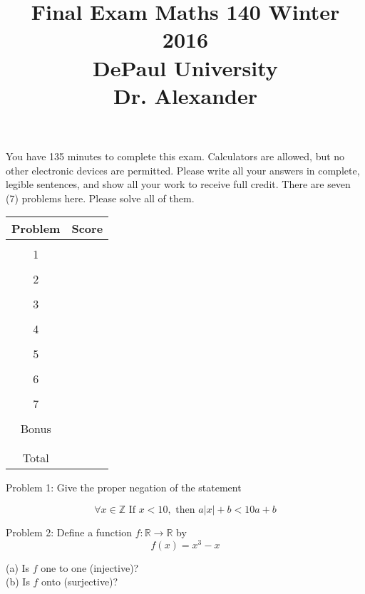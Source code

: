 \documentclass[16 pt]{amsart}
\theoremstyle{definition}
\theoremstyle{remark}
\numberwithin{equation}{subsection}
\newcommand{\R}{\mathbb{R}}
\newcommand{\Z}{\mathbb{Z}}
\begin{document}
\title{Final Exam Maths 140 Winter 2016 \\ DePaul University\\Dr. Alexander}
\maketitle
You have 135 minutes to complete this exam.  Calculators are allowed, but no other electronic devices are permitted.  Please write all your answers in complete, legible sentences, and show all your work to receive full credit.  There are seven (7) problems here.  Please solve all of them.  
\vspace{1in}


\begin{center}
  \begin{tabular}{ c | c }
    Problem & Score\\
    \hline
    &\\
    1&\\
    &\\
    2&\\
    &\\
    3&\\
    &\\
    4&\\
    &\\
    5&\\
    &\\
    6&\\
    &\\
    7&\\
    &\\
    Bonus &\\
    &\\
    \hline 
    &\\    
    Total& 
 \end{tabular}
\end{center}


\newpage


Problem 1: Give the proper negation of the statement

\[
\forall x\in \Z \text{ If } x < 10, \text{ then } a|x|+b < 10 a + b  
\]

\newpage


Problem 2: Define a function $f: \R \rightarrow \R$ by
\[
f(x) = x^3-x 
\]


(a) Is $f$ one to one (injective)?\\

(b) Is $f$ onto (surjective)?
\end{document}
